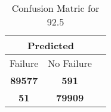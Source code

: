 \begin{table}[] 
\caption{Confusion Matric for 92.5} 
\label{Table: Prediction Accuracy-DMD92.5OnlySunEKF-combinationReflectionEKF-top2perfectNoFailurePrediction-Reflection} 
\centering 
\begin{tabular} 
 {@{}ccc@{}} 
\toprule 
\multicolumn{2}{c}{\textbf{Predicted}}
 \\ \midrule 
\multicolumn{1}{|c|}{Failure} & 
\multicolumn{1}{c|}{No Failure}
 \\ \midrule 
\multicolumn{1}{|c|}{\color{green}\textbf{89577}} & 
\multicolumn{1}{c|}{\color{red}\textbf{591}}
 \\ \midrule 
\multicolumn{1}{|c|}{\color{red}\textbf{51}} & 
\multicolumn{1}{c|}{\color{green}\textbf{79909}}
 \\ \bottomrule 
\end{tabular} 
\end{table} 
